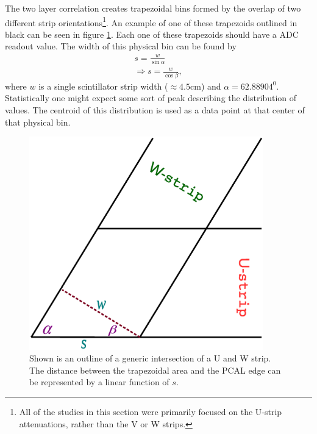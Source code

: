 The two layer correlation creates trapezoidal bins formed by the overlap of two different 
strip orientations\footnote{All of the studies in this section were primarily focused on the U-strip 
attenuations, rather than the V or W strips.}. An example of one of these trapezoids outlined in black can be 
seen in figure \ref{fig:trapezoidUWintersection}. Each one of these trapezoids should have a ADC readout value. The width 
of this physical bin can be found by
\begin{eqnarray}
 s = \frac{w}{\sin{\alpha}}    \nonumber\\
\Rightarrow s = \frac{w}{\cos{\beta}},
\end{eqnarray}
where $w$ is a single scintillator strip width ($\approx 4.5$cm) and $\alpha = 62.88904^0$. Statistically one might expect some 
sort of peak describing the distribution of values. The centroid of this distribution is used as a data point 
at that center of that physical bin.
\begin{figure}[t]
\centering
\includegraphics[width= 4in, keepaspectratio = true]{trapezoidUWintersection}
\caption{Shown is an outline of a generic intersection of a U and W strip. The distance between the trapezoidal area and the 
PCAL edge can be represented by a linear function of $s$.}
\label{fig:trapezoidUWintersection}
\end{figure}
\FloatBarrier

\clearpage
